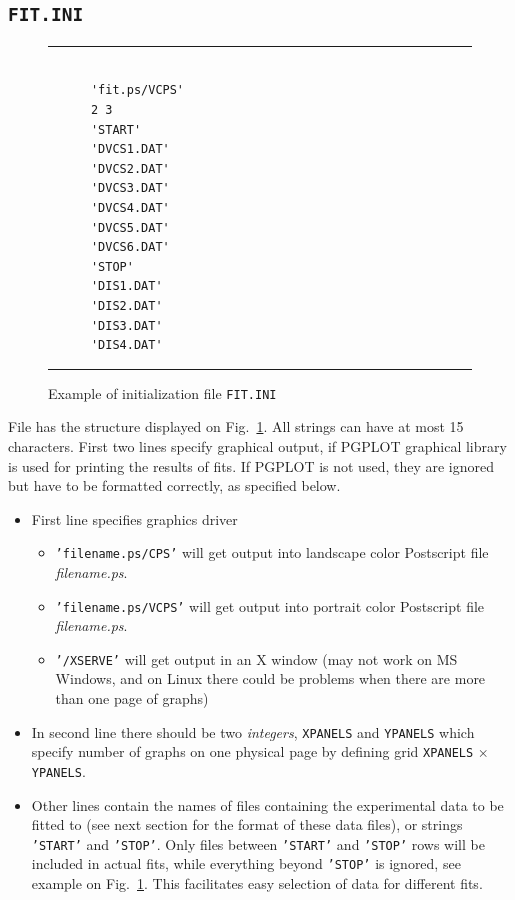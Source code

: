\documentclass[12pt]{article}
\begin{document}
\subsection{\texttt{FIT.INI}}

\begin{figure}[t]
\begin{center}
\hrule
\begin{verbatim}

      'fit.ps/VCPS'
      2 3
      'START'
      'DVCS1.DAT'
      'DVCS2.DAT'
      'DVCS3.DAT'
      'DVCS4.DAT'
      'DVCS5.DAT'
      'DVCS6.DAT'
      'STOP'
      'DIS1.DAT'
      'DIS2.DAT'
      'DIS3.DAT'
      'DIS4.DAT'

\end{verbatim}
\hrule
\end{center}
\caption{Example of initialization file \texttt{FIT.INI}}
\label{fig:FIT.INI}
\end{figure}

File has the structure displayed on Fig.~\ref{fig:FIT.INI}.
All strings can have at most 15 characters.
First two lines specify graphical output, if PGPLOT graphical
library is used for printing the results of fits. If PGPLOT
is not used, they are ignored but have to be formatted correctly,
as specified below.

\begin{itemize}

\item 
First line specifies graphics driver
  \begin{itemize}
  \item \texttt{'filename.ps/CPS'}  will get output into landscape color Postscript file 
             \emph{filename.ps}.
  \item \texttt{'filename.ps/VCPS'}  will get output into portrait color Postscript file 
             \emph{filename.ps}.
  \item \texttt{'/XSERVE'} will get output in an X window (may not work on MS Windows, and
   on Linux there could be problems when there are more than one page of graphs)
  \end{itemize}

\item
In second line there should be two \emph{integers}, \texttt{XPANELS} and \texttt{YPANELS}
which specify number of graphs on one physical page by defining grid \texttt{XPANELS} 
$\times$ \texttt{YPANELS}.

\item
Other lines contain the names of files containing the experimental data to be fitted to (see next
section for the format of these data files), or strings \texttt{'START'} and \texttt{'STOP'}. 
Only files between \texttt{'START'}
and \texttt{'STOP'} rows will be included in actual fits, while everything beyond
\texttt{'STOP'} is ignored, see example on Fig.~\ref{fig:FIT.INI}.
This facilitates easy selection of data for different fits.
\end{itemize}
\end{document}

